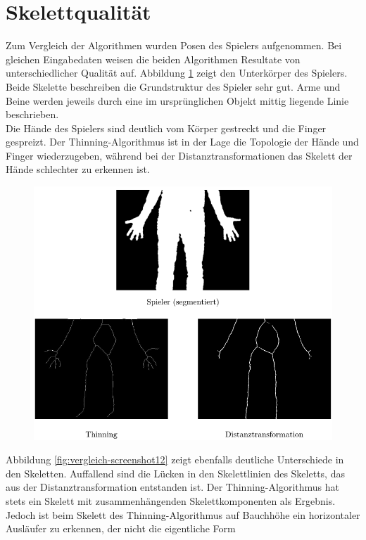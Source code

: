 \section{Skelettqualität}
Zum Vergleich der Algorithmen wurden Posen des Spielers aufgenommen. Bei gleichen Eingabedaten
weisen die beiden Algorithmen Resultate von unterschiedlicher Qualität auf. Abbildung \ref{fig:vergleich-screenshot0} zeigt
den Unterkörper des Spielers. Beide Skelette beschreiben die Grundstruktur des Spieler sehr gut. Arme und Beine werden jeweils durch eine im ursprünglichen Objekt mittig liegende Linie beschrieben. \\ Die Hände des Spielers sind deutlich vom Körper gestreckt und die Finger gespreizt. Der Thinning-Algorithmus ist in der Lage die Topologie der Hände und Finger wiederzugeben, während bei der
Distanztransformationen das Skelett der Hände schlechter zu erkennen ist. \\ 
\begin{figure}[htbp]
\centering
\includegraphics[width=1.0\linewidth]{./fig/vergleich-screenshot0}
\caption{}
\label{fig:vergleich-screenshot0}
\end{figure}
Abbildung \ref{fig:vergleich-screenshot12} zeigt ebenfalls deutliche Unterschiede in den Skeletten. Auffallend sind die Lücken in den Skelettlinien des Skeletts, das aus der Distanztransformation entstanden 
ist. Der Thinning-Algorithmus hat stets ein Skelett mit zusammenhängenden Skelettkomponenten als Ergebnis. 
Jedoch ist beim Skelett des Thinning-Algorithmus auf Bauchhöhe ein horizontaler Ausläufer zu erkennen, der nicht die eigentliche Form
